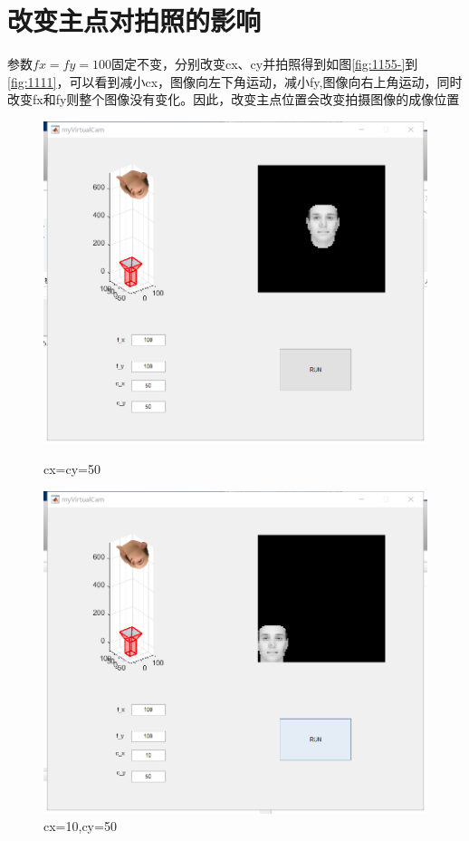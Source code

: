 \documentclass{xcumcmart}
\begin{document}
\section{改变主点对拍照的影响}
\par 参数$fx=fy=100$固定不变，分别改变cx、cy并拍照得到如图\ref{fig:1155-}到\ref{fig:1111}，可以看到减小cx，图像向左下角运动，减小fy,图像向右上角运动，同时改变fx和fy则整个图像没有变化。因此，改变主点位置会改变拍摄图像的成像位置
\begin{figure}[htbp]
\centering
\begin{minipage}[htbp]{0.48\linewidth}
    \centering
	\includegraphics[width=1\textwidth]{fig/1155.png}
	\caption{cx=cy=50\label{fig:1155-}}
\end{minipage}
\hfill
\begin{minipage}[htbp]{0.48\linewidth}
    \centering
	\includegraphics[width=1\textwidth]{fig/1115.png}
	\caption{cx=10,cy=50\label{fig:1115}}
\end{minipage}
\end{figure}
\end{document}
